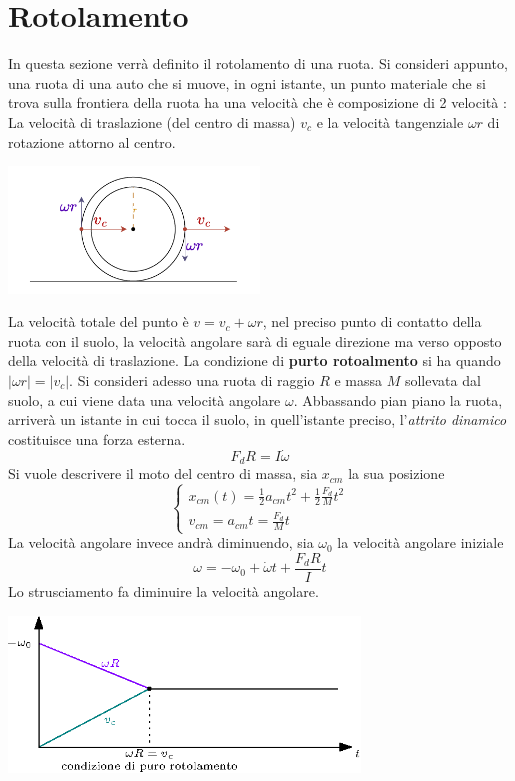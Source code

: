 \documentclass[10pt, letterpaper]{report}
\begin{document}
\section{Rotolamento}
In questa sezione verrà definito il rotolamento di una ruota. Si consideri appunto, una ruota di una auto che si muove, in ogni istante, un punto materiale che si trova sulla frontiera della ruota ha una velocità che è 
composizione di 2 velocità : La velocità di traslazione (del centro di massa) $v_c$ e la velocità tangenziale $\omega r$ di rotazione attorno al centro.
\begin{center}
    \includegraphics[width=0.5\textwidth ]{images/rotolamento.pdf}
\end{center}
La velocità totale del punto è $v=v_c+\omega r$, nel preciso punto di contatto della ruota con il suolo, la velocità angolare sarà di eguale direzione ma verso opposto della velocità di traslazione. La condizione di 
\textbf{purto rotoalmento} si ha quando $|\omega r |= |v_c|$. \acc 
Si consideri adesso una ruota di raggio $R$ e massa $M$ sollevata dal suolo, a cui viene data una velocità angolare $\omega$. Abbassando pian piano la ruota, arriverà un istante in cui tocca il suolo, in quell'istante preciso, 
l'\textit{attrito dinamico} costituisce una forza esterna.
$$ F_dR=I\dot{\omega}$$
Si vuole descrivere il moto del centro di massa, sia $x_{cm}$ la sua posizione 
$$ \begin{cases}
    x_{cm}(t)=\frac{1}{2}a_{cm}t^2+\frac{1}{2}\frac{F_d}{M}t^2 \\ 
    v_{cm}=a_{cm}t=\frac{F_d}{M}t
\end{cases}$$
La velocità angolare invece andrà diminuendo, sia $\omega_0$ la velocità angolare iniziale 
$$ \omega = -\omega_0+\dot{\omega}t+\frac{F_dR}{I}t$$
Lo strusciamento fa diminuire la velocità angolare.
\begin{center}
    \includegraphics[width=0.7\textwidth ]{images/puroRot.eps}
\end{center}
\end{document}
